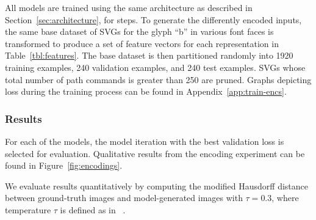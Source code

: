 All models are trained using the same architecture as described in Section~\ref{sec:architecture}, for  steps.
To generate the differently encoded inputs, the same base dataset of SVGs for the glyph ``b'' in various font faces is transformed to produce a set of feature vectors for each representation in Table~\ref{tbl:features}.
The base dataset is then partitioned randomly into 1920 training examples, 240 validation examples, and 240 test examples.
SVGs whose total number of path commands is greater than 250 are pruned.
Graphs depicting loss during the training process can be found in Appendix~\ref{app:train-encs}.

\subsubsection{Results}
For each of the models, the model iteration with the best validation loss is selected for evaluation.
Qualitative results from the encoding experiment can be found in Figure~\ref{fig:encodings}.

We evaluate results quantitatively by computing the modified Hausdorff distance between ground-truth images and model-generated images with $\tau = 0.3$, where temperature $\tau$ is defined as in~\cite{ha2017neural} .


